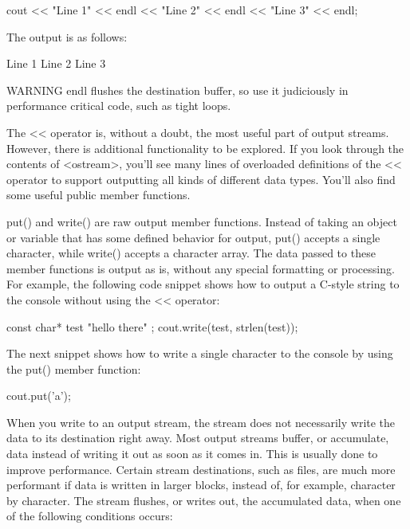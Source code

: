 \begin{cpp}
cout << "Line 1" << endl << "Line 2" << endl << "Line 3" << endl;
\end{cpp}

The output is as follows:

\begin{shell}
Line 1
Line 2
Line 3
\end{shell}

\begin{myWarning}{WARNING}
 endl flushes the destination buffer, so use it judiciously in performance critical code, such as tight loops.
\end{myWarning}


The <{}< operator is, without a doubt, the most useful part of output streams. However, there is additional functionality to be explored. If you look through the contents of <ostream>, you’ll see many lines of overloaded definitions of the <{}< operator to support outputting all kinds of different data types. You’ll also find some useful public member functions.


put() and write() are raw output member functions. Instead of taking an object or variable that has some defined behavior for output, put() accepts a single character, while write() accepts a character array. The data passed to these member functions is output as is, without any special formatting or processing. For example, the following code snippet shows how to output a C-style string to the console without using the <{}< operator:

\begin{cpp}
const char* test { "hello there" };
cout.write(test, strlen(test));
\end{cpp}

The next snippet shows how to write a single character to the console by using the put() member function:

\begin{cpp}
cout.put('a');
\end{cpp}


When you write to an output stream, the stream does not necessarily write the data to its destination right away. Most output streams buffer, or accumulate, data instead of writing it out as soon as it comes in. This is usually done to improve performance. Certain stream destinations, such as files, are much more performant if data is written in larger blocks, instead of, for example, character by character. The stream flushes, or writes out, the accumulated data, when one of the following conditions occurs:

